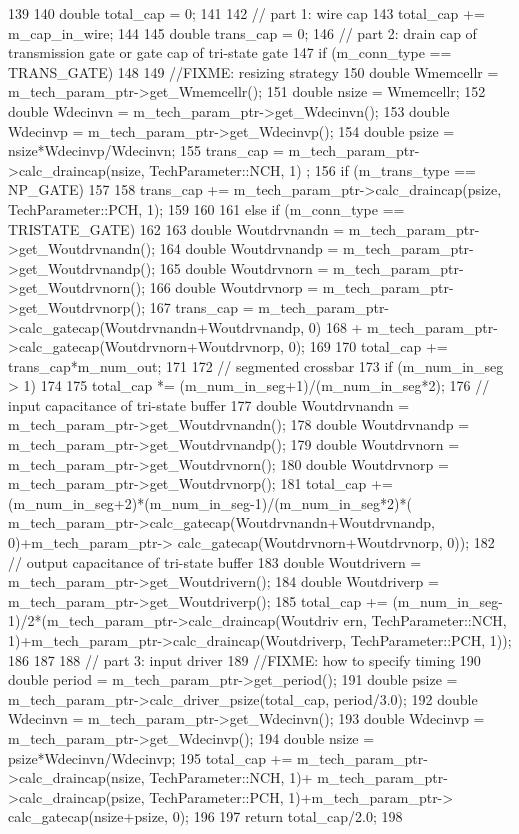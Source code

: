 \begin{DoxyCode}
139 {
140     double total_cap = 0;
141 
142     // part 1: wire cap
143     total_cap += m_cap_in_wire;
144 
145     double trans_cap = 0;
146     // part 2: drain cap of transmission gate or gate cap of tri-state gate
147     if (m_conn_type == TRANS_GATE)
148     {
149         //FIXME: resizing strategy
150         double Wmemcellr = m_tech_param_ptr->get_Wmemcellr();
151         double nsize = Wmemcellr;
152         double Wdecinvn = m_tech_param_ptr->get_Wdecinvn();
153         double Wdecinvp = m_tech_param_ptr->get_Wdecinvp();
154         double psize = nsize*Wdecinvp/Wdecinvn;
155         trans_cap = m_tech_param_ptr->calc_draincap(nsize, TechParameter::NCH, 1)
      ;
156         if (m_trans_type == NP_GATE)
157         {
158             trans_cap += m_tech_param_ptr->calc_draincap(psize, 
      TechParameter::PCH, 1);
159         }
160     }
161     else if (m_conn_type == TRISTATE_GATE)
162     {
163         double Woutdrvnandn = m_tech_param_ptr->get_Woutdrvnandn();
164         double Woutdrvnandp = m_tech_param_ptr->get_Woutdrvnandp();
165         double Woutdrvnorn = m_tech_param_ptr->get_Woutdrvnorn();
166         double Woutdrvnorp = m_tech_param_ptr->get_Woutdrvnorp();
167         trans_cap = m_tech_param_ptr->calc_gatecap(Woutdrvnandn+Woutdrvnandp, 0)
168             + m_tech_param_ptr->calc_gatecap(Woutdrvnorn+Woutdrvnorp, 0);
169     }
170     total_cap += trans_cap*m_num_out;
171 
172     // segmented crossbar
173     if (m_num_in_seg > 1)
174     {
175         total_cap *= (m_num_in_seg+1)/(m_num_in_seg*2);
176         // input capacitance of tri-state buffer
177         double Woutdrvnandn = m_tech_param_ptr->get_Woutdrvnandn();
178         double Woutdrvnandp = m_tech_param_ptr->get_Woutdrvnandp();
179         double Woutdrvnorn = m_tech_param_ptr->get_Woutdrvnorn();
180         double Woutdrvnorp = m_tech_param_ptr->get_Woutdrvnorp();
181         total_cap += (m_num_in_seg+2)*(m_num_in_seg-1)/(m_num_in_seg*2)*(
      m_tech_param_ptr->calc_gatecap(Woutdrvnandn+Woutdrvnandp, 0)+m_tech_param_ptr->
      calc_gatecap(Woutdrvnorn+Woutdrvnorp, 0));
182         // output capacitance of tri-state buffer
183         double Woutdrivern = m_tech_param_ptr->get_Woutdrivern();
184         double Woutdriverp = m_tech_param_ptr->get_Woutdriverp();
185         total_cap += (m_num_in_seg-1)/2*(m_tech_param_ptr->calc_draincap(Woutdriv
      ern, TechParameter::NCH, 1)+m_tech_param_ptr->calc_draincap(Woutdriverp, 
      TechParameter::PCH, 1));
186     }
187 
188     // part 3: input driver
189     //FIXME: how to specify timing
190     double period = m_tech_param_ptr->get_period();
191     double psize = m_tech_param_ptr->calc_driver_psize(total_cap, period/3.0);
192     double Wdecinvn = m_tech_param_ptr->get_Wdecinvn();
193     double Wdecinvp = m_tech_param_ptr->get_Wdecinvp();
194     double nsize = psize*Wdecinvn/Wdecinvp;
195     total_cap += m_tech_param_ptr->calc_draincap(nsize, TechParameter::NCH, 1)+
      m_tech_param_ptr->calc_draincap(psize, TechParameter::PCH, 1)+m_tech_param_ptr->
      calc_gatecap(nsize+psize, 0);
196 
197     return total_cap/2.0;
198 }
\end{DoxyCode}
